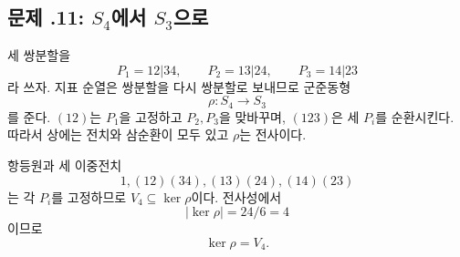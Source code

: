 \subsection*{문제 \thechapter.11: $S_4$에서 $S_3$으로}

\begin{solution}
세 쌍분할을
\[
  P_1=12|34,\qquad P_2=13|24,\qquad P_3=14|23
\]
라 쓰자. 지표 순열은 쌍분할을 다시 쌍분할로 보내므로 군준동형
\[
  \rho:S_4\to S_3
\]
를 준다. $(12)$는 $P_1$을 고정하고 $P_2,P_3$을 맞바꾸며, $(123)$은 세 $P_i$를 순환시킨다. 따라서 상에는 전치와 삼순환이 모두 있고 $\rho$는 전사이다.

항등원과 세 이중전치
\[
  1,(12)(34),(13)(24),(14)(23)
\]
는 각 $P_i$를 고정하므로 $V_4\subseteq\ker\rho$이다. 전사성에서
\[
  |\ker\rho|=24/6=4
\]
이므로
\[
  \ker\rho=V_4.
\]
\end{solution}
